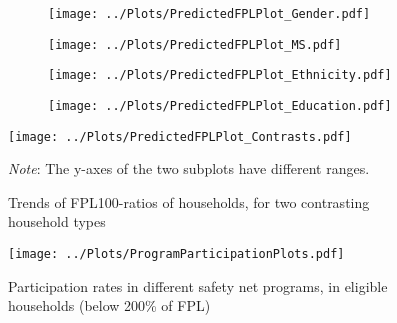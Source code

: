 \begin{figure}[H]
\centering
\caption{Trends of FPL100-ratios, for households with a working age adult with disability (a) by gender (b) by marital status (c) by race and ethnicity (d) by education, of reference person}
\begin{subfigure}{0.49\linewidth}
\texttt{[image: ../Plots/PredictedFPLPlot\_Gender.pdf]}
\caption{}
\label{fig:disab_gender}
\end{subfigure}
\begin{subfigure}{0.49\linewidth}
\texttt{[image: ../Plots/PredictedFPLPlot\_MS.pdf]} 
\caption{}
\label{fig:disab_MS} 
\end{subfigure}
\newline
\begin{subfigure}{0.49\linewidth}
\texttt{[image: ../Plots/PredictedFPLPlot\_Ethnicity.pdf]}
\caption{}
\label{fig:disab_race}
\end{subfigure}
\begin{subfigure}{0.49\linewidth}
\texttt{[image: ../Plots/PredictedFPLPlot\_Education.pdf]}
\caption{}
\label{fig:disab_education}
\end{subfigure}
\label{fig:Disab_Demographics}
\end{figure}

\begin{figure}[H]
\centering
\caption{Trends of FPL100-ratios of households, for two contrasting household types}
\texttt{[image: ../Plots/PredictedFPLPlot\_Contrasts.pdf]}
\label{fig:contrasts}
\begin{minipage}{0.65\textwidth} %
{\footnotesize {\textit{Note}}: The y-axes of the two subplots have different ranges.}
\end{minipage}
\end{figure}

\begin{figure}[H]
\caption{Participation rates in different safety net programs, in eligible households (below 200\% of FPL)}
\centering
\texttt{[image: ../Plots/ProgramParticipationPlots.pdf]}
\label{fig:programParticipation}
\end{figure}

